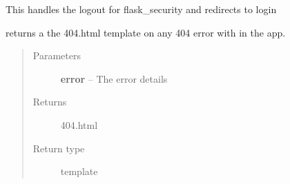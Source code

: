 \documentclass[letterpaper,10pt,english]{sphinxmanual}
\begin{document}
\begin{fulllineitems}
\label{dev-overview:cagenix.create_user}
\end{fulllineitems}


\begin{fulllineitems}
\label{dev-overview:cagenix.handle_splash}
\end{fulllineitems}


\begin{fulllineitems}
\label{dev-overview:cagenix.logout}
This handles the logout for flask\_security and redirects to login

\end{fulllineitems}


\begin{fulllineitems}
\label{dev-overview:cagenix.not_found}
returns a the 404.html template on any 404 error with in the app.
\begin{quote}\begin{description}
\item[{Parameters}] \leavevmode
\textbf{error} -- The error details

\item[{Returns}] \leavevmode
404.html

\item[{Return type}] \leavevmode
template

\end{description}\end{quote}

\end{fulllineitems}
\end{document}
